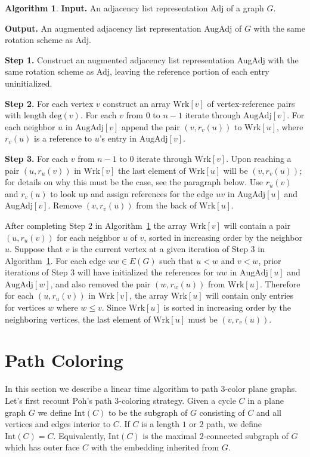 \documentclass[12pt,letterpaper]{article}
\theoremstyle{plain}
\theoremstyle{definition}
\theoremstyle{break}
\newtheorem{algorithm}[lemma]{Algorithm}     %
\begin{document}
\begin{algorithm}\label{A:augment}
\textbf{Input.} An adjacency list representation Adj of a graph $G$.

\textbf{Output.} An augmented adjacency list representation AugAdj of
$G$ with the same rotation scheme as Adj.

\textbf{Step 1.} Construct an augmented adjacency list representation AugAdj
with the same rotation scheme as Adj, leaving the reference portion of each
entry uninitialized.

\textbf{Step 2.} For each vertex $v$ construct an array $\text{Wrk}[v]$
of vertex-reference pairs with length $\text{deg}(v)$. For each $v$ from
$0$ to $n-1$ iterate through
$\text{AugAdj}[v]$. For each neighbor $u$ in $\text{AugAdj}[v]$ append the pair
$(v,r_v(u))$ to
$\text{Wrk}[u]$, where $r_v(u)$ is a reference to $u$'s entry in
$\text{AugAdj}[v]$.

\textbf{Step 3.} For each $v$ from $n-1$ to $0$ iterate through
$\text{Wrk}[v]$. Upon reaching a pair $(u,r_u(v))$ in $\text{Wrk}[v]$ the
last element of $\text{Wrk}[u]$ will be $(v,r_v(u))$; for details on why this
must be the case, see the paragraph below. Use
$r_u(v)$ and $r_v(u)$ to look up and assign references for the edge $uv$ in
AugAdj$[u]$ and AugAdj$[v]$. Remove $(v,r_v(u))$ from the back of
$\text{Wrk}[u]$.
\end{algorithm}

After completing Step $2$ in Algorithm~\ref{A:augment} the array $\text{Wrk}[v]$
will contain
a pair $(u,r_u(v))$ for each neighbor $u$ of $v$, sorted in increasing order by
the neighbor $u$.
Suppose that $v$ is the current vertex at a given iteration of Step $3$ in
Algorithm~\ref{A:augment}. For each edge $uw\in E(G)$ such that
$u<w$ and $v<w$, prior iterations of Step 3 will have initialized the
references for $uw$ in $\text{AugAdj}[u]$ and $\text{AugAdj}[w]$, and also
removed the pair
$(w,r_w(u))$ from $\text{Wrk}[u]$. Therefore for each $(u,r_u(v))$ in
$\text{Wrk}[v]$, the array $\text{Wrk}[u]$ will contain only entries for
vertices $w$ where $w\le v$. Since $\text{Wrk}[u]$ is sorted in
increasing order by the neighboring vertices, the last element of
$\text{Wrk}[u]$ must be $(v,r_v(u))$.

\section{Path Coloring}

In this section we describe a linear time algorithm to path $3$-color
plane graphs. Let's first recount Poh's path $3$-coloring strategy.
Given a cycle $C$ in a plane graph $G$ we define $\text{Int}(C)$ to
be the subgraph of $G$ consisting of $C$ and all vertices and edges interior to
$C$. If $C$ is a length $1$ or $2$ path, we define $\text{Int}(C)=C$.
Equivalently, $\text{Int}(C)$ is the maximal $2$-connected subgraph of
$G$ which has outer face $C$ with the embedding inherited from $G$.
\end{document}
